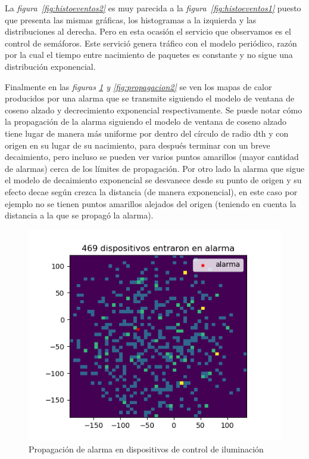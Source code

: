 La \textit{figura~\ref{fig:histoeventos2}} es muy parecida a la \textit{figura~\ref{fig:histoeventos1}} puesto que presenta las mismas gráficas, los histogramas a la izquierda y las distribuciones al derecha.  Pero en esta ocasión el servicio que observamos es el control de semáforos. Este servició genera  tráfico con el modelo periódico, razón por la cual el tiempo entre nacimiento de paquetes  es constante y no sigue una distribución exponencial.\newline

\hfill

\break

Finalmente en las \textit{figuras \ref{fig:propagacion1} y \ref{fig:propagacion2}} se ven los mapas de calor producidos por una alarma que se transmite siguiendo el modelo de ventana de coseno alzado y decrecimiento exponencial respectivamente. Se puede notar cómo la propagación de la alarma siguiendo el modelo de ventana de coseno alzado tiene lugar de manera más uniforme por dentro del círculo de radio dth  y con origen en su lugar de su nacimiento, para después terminar con un breve decaimiento, pero incluso se pueden ver varios puntos amarillos (mayor cantidad de alarmas) cerca de los límites de propagación. Por otro lado la alarma que sigue el modelo de decaimiento exponencial se desvanece desde su punto de origen y su efecto decae según crezca la distancia (de manera exponencial), en este caso por ejemplo no se tienen puntos amarillos alejados del origen (teniendo en cuenta la distancia a la que se propagó la alarma).\newline

\begin{figure}[th]
    \centering
    \includegraphics[scale=.7]{Figures/UEs_de_tipo_Control_de_iluminacion_activados_por_una_alarma.png}
    \decoRule
    \caption[Propagación de alarma en dispositivos de control de iluminación]{Propagación de alarma en dispositivos de control de iluminación}
    \label{fig:propagacion1}
\end{figure}

